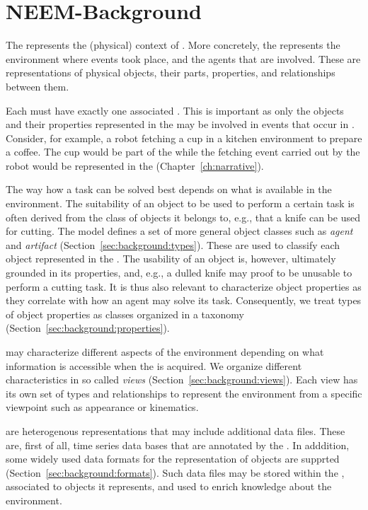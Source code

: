 
\chapter{NEEM-Background}
\label{ch:background}

The \neembak represents the (physical) context of \neems.
More concretely, the \neembak represents the environment where events took place, and the agents that are involved.
These are representations of physical objects, their parts, properties, and relationships between them.

Each \neem must have exactly one associated \neembak.
This is important as only the objects and their properties represented in the \neembak may be involved in events that occur in \neems.
Consider, for example, a robot fetching a cup in a kitchen environment to prepare a coffee.
The cup would be part of the \neembak while the fetching event carried out by the robot would be represented in the \neemnar (Chapter~\ref{ch:narrative}).

The way how a task can be solved best depends on what is available in the environment.
The suitability of an object to be used to perform a certain task is often derived from the class of objects it belongs to, e.g., that a knife can be used for cutting.
The \neem model defines a set of more general object classes such as \emph{agent} and \emph{artifact} (Section~\ref{sec:background:types}).
These are used to classify each object represented in the \neembak.
%
The usability of an object is, however, ultimately grounded in its properties, and, e.g., a dulled knife may proof to be unusable to perform a cutting task.
It is thus also relevant to characterize object properties as they correlate with how an agent may solve its task.
Consequently, we treat types of object properties as classes organized in a taxonomy (Section~\ref{sec:background:properties}).

\neems may characterize different aspects of the environment depending on what information is accessible when the \neem is acquired.
We organize different characteristics in so called \emph{views} (Section~\ref{sec:background:views}).
Each view has its own set of types and relationships to represent the environment from a specific viewpoint such as appearance or kinematics.

\neems are heterogenous representations that may include additional data files.
These are, first of all, time series data bases that are annotated by the \neemnar.
In adddition, some widely used data formats for the representation of objects are supprted (Section~\ref{sec:background:formats}).
Such data files may be stored within the \neembak, associated to objects it represents, and used to enrich knowledge about the environment.

